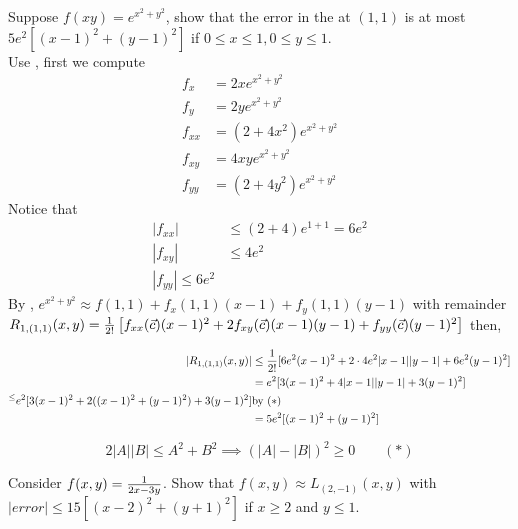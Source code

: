 \documentclass[english, 11pt]{article}
\begin{document}
\begin{exmp}
  Suppose $f(xy) = e^{x^2 + y^2}$, show that the error in the  at $(1,1)$ is at most $5e^2[(x-1)^2 + (y-1)^2]$ if $0 \leq x \leq 1, 0 \leq y \leq 1$. \\

  Use , first we compute
  \begin{align*}
    f_x & = 2xe^{x^2 + y^2} \\
    f_y & = 2ye^{x^2 + y^2} \\
    f_{xx} & = (2+4x^2)e^{x^2 + y^2} \\
    f_{xy} & = 4xye^{x^2 + y^2} \\
    f_{yy} & = (2+4y^2)e^{x^2 + y^2}
  \end{align*}
  Notice that
  \begin{align*}
    |f_{xx}| & \leq (2 + 4)e^{1 + 1} = 6 e^2 \\
    |f_{xy}| & \leq 4e^2 \\
    |f_{yy}| \leq 6e^2
  \end{align*}
  By , $e^{x^2 + y^2} \approx f(1,1) + f_x(1,1)(x-1) + f_y(1,1)(y-1)$ with remainder $R_{1,(1,1)}(x,y) = \frac{1}{2!}\left[f_{xx}(\vec{c})(x-1)^2 + 2f_{xy}(\vec{c})(x-1)(y-1) + f_{yy}(\vec{c})(y-1)^2 \right]$ then,

  \begin{align*}
    |R_{1,(1,1)}(x,y)| & \leq \frac{1}{2!} [6e^2(x-1)^2 + 2\cdot 4e^2 |x-1||y-1| + 6e^2(y-1)^2] \\
    & = e^2[3(x-1)^2 + 4|x-1||y-1|+ 3(y-1)^2] \\
    ^ \leq e^2[3(x-1)^2 + 2((x-1)^2 + (y-1)^2) + 3(y-1)^2] & \mbox{by ($*$)}\\
    & = 5e^2[(x-1)^2 + (y-1)^2]
  \end{align*}

  \begin{note}
    \[ 2|A||B| \leq A^2 + B^2 \implies (|A| - |B|)^2 \geq 0 \ \ \ \ \ \ \ \ \ (*) \]
  \end{note}

  \begin{exmp}
    Consider $f(x,y) = \frac{1}{2x-3y}$. Show that $f(x,y) \approx L_{(2,-1)}(x,y)$ with $|error| \leq 15[(x-2)^2 + (y+1)^2]$ if $x \geq 2$ and $y \leq 1$. \\


\end{exmp}
\end{exmp}
\end{document}
